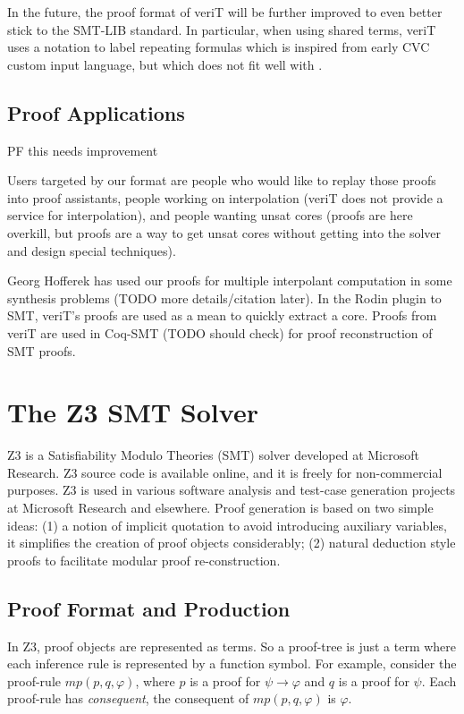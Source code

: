 \documentclass{llncs}
\begin{document}
In the future, the proof format of veriT will be further improved to even better
stick to the SMT-LIB standard.  In particular, when using shared terms, veriT
uses a notation to label repeating formulas which is inspired from early CVC custom input language, but which does not fit well with .

\subsection{Proof Applications}

PF this needs improvement


Users targeted by our format are people who would like to replay those proofs into proof assistants, people working on interpolation (veriT does not provide a service for interpolation), and people wanting unsat cores (proofs are here overkill, but proofs are a way to get unsat cores without getting into the solver and design special techniques).

Georg Hofferek has used our proofs for multiple interpolant computation in some synthesis problems (TODO more details/citation later).  In the Rodin plugin to SMT, veriT's proofs are used as a mean to quickly extract a core.  Proofs from veriT are used in Coq-SMT (TODO should check) for proof reconstruction of SMT proofs.

\section{The Z3 SMT Solver}
\label{sec:z3}

Z3 is a Satisfiability Modulo Theories (SMT) solver developed at
Microsoft Research.  Z3 source code is available online, and it is
freely for non-commercial purposes.  Z3 is used in various software
analysis and test-case generation projects at Microsoft Research and
elsewhere.  Proof generation is based on two simple ideas: (1) a
notion of implicit quotation to avoid introducing auxiliary variables,
it simplifies the creation of proof objects considerably; (2) natural
deduction style proofs to facilitate modular proof re-construction.

\subsection{Proof Format and Production}

In Z3, proof objects are represented as terms. So a proof-tree is just a term
where each inference rule is represented by a function symbol.
For example, consider the proof-rule $mp(p, q, \varphi)$, where $p$ is a proof for
$\psi \rightarrow \varphi$ and $q$ is a proof for $\psi$. Each proof-rule has
\emph{consequent}, the consequent of $mp(p, q, \varphi)$ is $\varphi$.
\end{document}
